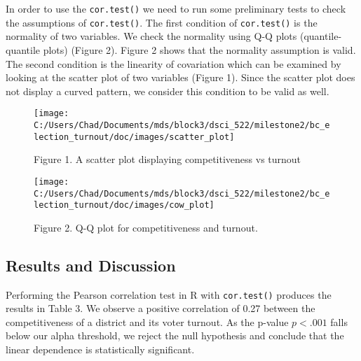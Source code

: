 \documentclass[
]{article}
\begin{document}
In order to use the \texttt{cor.test()} we need to run some preliminary
tests to check the assumptions of \texttt{cor.test()}. The first
condition of \texttt{cor.test()} is the normality of two variables. We
check the normality using Q-Q plots (quantile-quantile plots) (Figure
2). Figure 2 shows that the normality assumption is valid. The second
condition is the linearity of covariation which can be examined by
looking at the scatter plot of two variables (Figure 1). Since the
scatter plot does not display a curved pattern, we consider this
condition to be valid as well.

\begin{figure}
\texttt{[image: C:/Users/Chad/Documents/mds/block3/dsci\_522/milestone2/bc\_election\_turnout/doc/images/scatter\_plot]} \caption{Figure 1. A scatter plot displaying competitiveness vs turnout}\label{fig:unnamed-chunk-2}
\end{figure}

\begin{figure}
\texttt{[image: C:/Users/Chad/Documents/mds/block3/dsci\_522/milestone2/bc\_election\_turnout/doc/images/cow\_plot]} \caption{Figure 2. Q-Q plot for competitiveness and turnout.}\label{fig:unnamed-chunk-3}
\end{figure}

\hypertarget{results-and-discussion}{%
\subsection{Results and Discussion}\label{results-and-discussion}}

Performing the Pearson correlation test in R with \texttt{cor.test()}
produces the results in Table 3. We observe a positive correlation of
0.27 between the competitiveness of a district and its voter turnout. As
the p-value \(p < .001\) falls below our alpha threshold, we reject the
null hypothesis and conclude that the linear dependence is statistically
significant.
\end{document}
